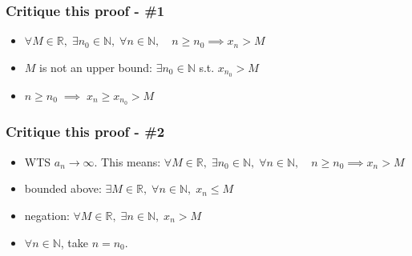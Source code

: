 \begin{frame}[t]
	\fontsize{13}{13}\selectfont
	\frametitle{Critique this proof - \#1}

	\begin{itemize}
		\vfill

		\item $\displaystyle \forall M \in \mathbb{R}, \; \exists n_{0}\in \mathbb{N}
			, \; \forall n \in \mathbb{N}, \quad n\geq n_{0}\implies x_{n}> M$
			\vfill
			\vfill

		\item $M$ is not an upper bound: $\displaystyle \exists n_{0}\in \mathbb{N}$
			s.t. $\displaystyle x_{n_0}> M$
			\vfill
			\vfill

		\item $\displaystyle n \geq n_{0}\; \implies \; x_{n}\geq x_{n_0}> M$
			\vfill
	\end{itemize}
\end{frame}

\begin{frame}[t]
	\fontsize{13}{13}\selectfont
	\frametitle{Critique this proof - \#2}

	\begin{itemize}
		\vfill

		\item WTS $a_{n}\rightarrow \infty$. This means:
			\vspace{.2cm}
			\quad $\displaystyle \forall M \in \mathbb{R}, \; \exists n_{0}\in \mathbb{N}
			, \; \forall n \in \mathbb{N}, \quad n\geq n_{0}\implies x_{n}> M$
			\vfill
			\vfill

		\item bounded above: \quad
			$\displaystyle \exists M \in \mathbb{R}, \; \forall n \in \mathbb{N}, \; x_{n}
			\leq M$
			\vfill
			\vfill

		\item negation: \quad
			$\displaystyle \forall M \in \mathbb{R}, \; \exists n \in \mathbb{N}, \; x_{n}
			> M$
			\vfill
			\vfill

		\item $\forall n \in \mathbb{N}$, take $n=n_{0}$.
			\vfill
	\end{itemize}
\end{frame}

